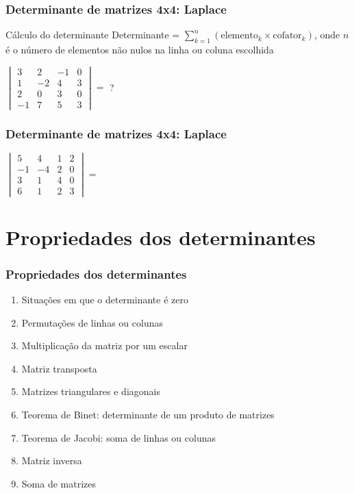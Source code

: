 \documentclass[pdftex, brazil, aspectratio=169]{beamer}
\begin{document}
\begin{frame}[t]
  \frametitle{Determinante de matrizes 4x4: Laplace}
  \begin{block}{Cálculo do determinante}
    Determinante = $\displaystyle \sum_{k=1}^n (\text{elemento}_k \times \text{cofator}_k)$,
        onde $n$ é o número de elementos não nulos na linha ou coluna escolhida
  \end{block}
  $\begin{vmatrix}
    3 & 2 & -1 & 0\\
    1 & -2 & 4 & 3\\
    2 & 0 & 3 & 0\\
    -1 & 7 & 5 & 3\end{vmatrix} =$ ?
\end{frame}

\begin{frame}[t]
  \frametitle{Determinante de matrizes 4x4: Laplace}
  $\begin{vmatrix}
    5 & 4 & 1 & 2\\
    -1 & -4 & 2 & 0\\
    3 & 1 & 4 & 0\\
    6 & 1 & 2 & 3\end{vmatrix} =$
\end{frame}


\section{Propriedades dos determinantes}

\begin{frame}[t]
  \frametitle{Propriedades dos determinantes}
  \begin{enumerate}
    \item Situações em que o determinante é zero
    \item Permutações de linhas ou colunas
    \item Multiplicação da matriz por um escalar
    \item Matriz transposta
    \item Matrizes triangulares e diagonais
    \item Teorema de Binet: determinante de um produto de matrizes
    \item Teorema de Jacobi: soma de linhas ou colunas
    \item Matriz inversa
    \item Soma de matrizes
  \end{enumerate}
\end{frame}
\end{document}
